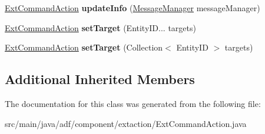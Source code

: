 \begin{DoxyCompactItemize}
\hypertarget{classadf_1_1component_1_1extaction_1_1ExtCommandAction_a1194d75e3bd1c8953b4d30cdac47400f}{}\label{classadf_1_1component_1_1extaction_1_1ExtCommandAction_a1194d75e3bd1c8953b4d30cdac47400f} 
\hyperlink{classadf_1_1component_1_1extaction_1_1ExtCommandAction}{Ext\+Command\+Action} {\bfseries update\+Info} (\hyperlink{classadf_1_1agent_1_1communication_1_1MessageManager}{Message\+Manager} message\+Manager)
\item 
\hypertarget{classadf_1_1component_1_1extaction_1_1ExtCommandAction_a810e1ecb2ef1551e05d3e956d4752317}{}\label{classadf_1_1component_1_1extaction_1_1ExtCommandAction_a810e1ecb2ef1551e05d3e956d4752317} 
\hyperlink{classadf_1_1component_1_1extaction_1_1ExtCommandAction}{Ext\+Command\+Action} {\bfseries set\+Target} (Entity\+I\+D... targets)
\item 
\hypertarget{classadf_1_1component_1_1extaction_1_1ExtCommandAction_a335e48bf82dcdd93e714281073b6f3c7}{}\label{classadf_1_1component_1_1extaction_1_1ExtCommandAction_a335e48bf82dcdd93e714281073b6f3c7} 
\hyperlink{classadf_1_1component_1_1extaction_1_1ExtCommandAction}{Ext\+Command\+Action} {\bfseries set\+Target} (Collection$<$ Entity\+ID $>$ targets)
\end{DoxyCompactItemize}
\subsection*{Additional Inherited Members}


The documentation for this class was generated from the following file\+:\begin{DoxyCompactItemize}
\item 
src/main/java/adf/component/extaction/Ext\+Command\+Action.\+java\end{DoxyCompactItemize}

